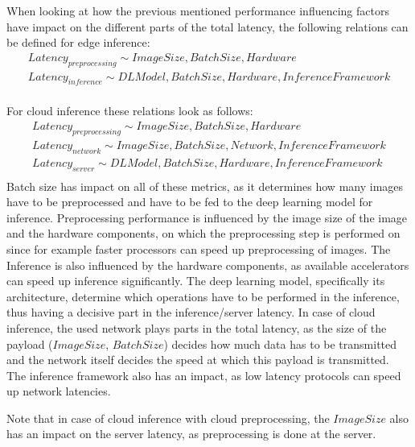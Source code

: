 When looking at how the previous mentioned performance influencing factors have impact on the different parts of the total latency, the following relations can be defined for edge inference:
\begin{equation*}
\begin{gathered}
 Latency_{preprocessing}\sim ImageSize, BatchSize, Hardware\\
 Latency_{inference} \sim DLModel, BatchSize, Hardware, Inference Framework\\
\end{gathered}
\end{equation*}

For cloud inference these relations look as follows:
\begin{equation*}
\begin{gathered}
 Latency_{preprocessing}\sim ImageSize, BatchSize, Hardware\\
 Latency_{network}\sim ImageSize, BatchSize, Network, Inference Framework\\
 Latency_{server} \sim DLModel, BatchSize, Hardware, Inference Framework\\
\end{gathered}
\end{equation*}
Batch size has impact on all of these metrics, as it determines how many images have to be preprocessed and have to be fed to the deep learning model for inference.
Preprocessing performance is influenced by the image size of the image and the hardware components, on which the preprocessing step is performed on since for example faster processors can speed up preprocessing of images.
The Inference is also influenced by the hardware components, as available accelerators can speed up inference significantly. 
The deep learning model, specifically its architecture, determine which operations have to be performed in the inference, thus having a decisive part in the inference/server latency.
In case of cloud inference, the used network plays parts in the total latency, as the size of the payload ($ImageSize$, $BatchSize$) decides how much data has to be transmitted and the network itself decides the speed at which this payload is transmitted. The inference framework also has an impact, as low latency protocols can speed up network latencies.

Note that in case of cloud inference with cloud preprocessing, the $ImageSize$ also has an impact on the server latency, as preprocessing is done at the server.


